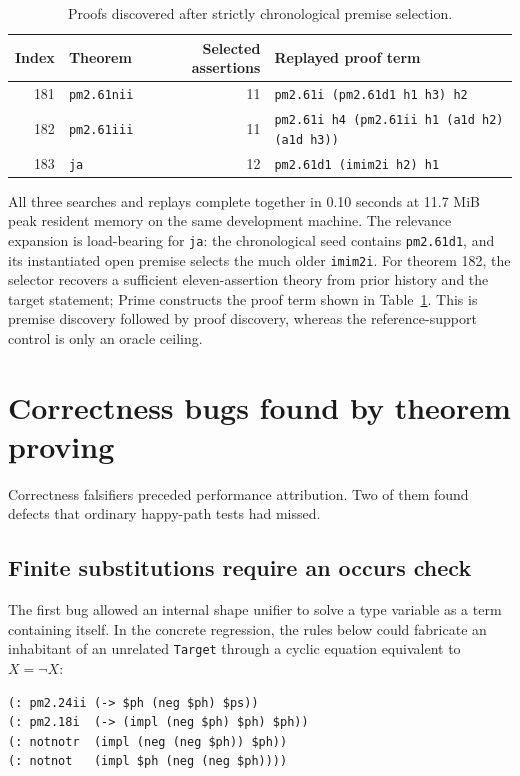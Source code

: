 \documentclass[10pt]{article}
\begin{document}
\begin{table}[ht]
\centering
\small
\begin{tabularx}{\linewidth}{@{}r l r X@{}}
\toprule
Index & Theorem & Selected assertions & Replayed proof term\\
\midrule
181 & \texttt{pm2.61nii} & 11 &
  \texttt{pm2.61i (pm2.61d1 h1 h3) h2}\\
182 & \texttt{pm2.61iii} & 11 &
  \texttt{pm2.61i h4 (pm2.61ii h1 (a1d h2) (a1d h3))}\\
183 & \texttt{ja} & 12 &
  \texttt{pm2.61d1 (imim2i h2) h1}\\
\bottomrule
\end{tabularx}
\caption{Proofs discovered after strictly chronological premise selection.}
\label{tab:chronological}
\end{table}

All three searches and replays complete together in 0.10 seconds at 11.7 MiB
peak resident memory on the same development machine.  The relevance
expansion is load-bearing for \texttt{ja}: the chronological seed contains
\texttt{pm2.61d1}, and its instantiated open premise selects the much older
\texttt{imim2i}.  For theorem 182, the selector recovers a sufficient
eleven-assertion theory from prior history and the target statement; Prime
constructs the proof term shown in Table~\ref{tab:chronological}.  This is
premise discovery followed by proof discovery, whereas the reference-support
control is only an oracle ceiling.

\section{Correctness bugs found by theorem proving}

Correctness falsifiers preceded performance attribution.  Two of them found
defects that ordinary happy-path tests had missed.

\subsection{Finite substitutions require an occurs check}

The first bug allowed an internal shape unifier to solve a type variable as a
term containing itself.  In the concrete regression, the rules below could
fabricate an inhabitant of an unrelated \texttt{Target} through a cyclic
equation equivalent to $X = \neg X$:

\begin{lstlisting}
(: pm2.24ii (-> $ph (neg $ph) $ps))
(: pm2.18i  (-> (impl (neg $ph) $ph) $ph))
(: notnotr  (impl (neg (neg $ph)) $ph))
(: notnot   (impl $ph (neg (neg $ph))))
\end{lstlisting}
\end{document}
